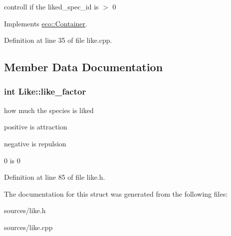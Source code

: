 controll if the liked\_\-spec\_\-id is $>$ 0 

Implements \hyperlink{classeco_1_1Container_aaba4667933eb47147b319f6daa7da5c2}{eco::Container}.



Definition at line 35 of file like.cpp.



\subsection{Member Data Documentation}
\hypertarget{structLike_aa10b4912394904201f7c75c4e9868a0f}{
\subsubsection[{like\_\-factor}]{\setlength{\rightskip}{0pt plus 5cm}int {\bf Like::like\_\-factor}}}
\label{structLike_aa10b4912394904201f7c75c4e9868a0f}


how much the species is liked 

positive is attraction

negative is repulsion

0 is 0 

Definition at line 85 of file like.h.



The documentation for this struct was generated from the following files:\begin{DoxyCompactItemize}
\item 
sources/like.h\item 
sources/like.cpp\end{DoxyCompactItemize}
